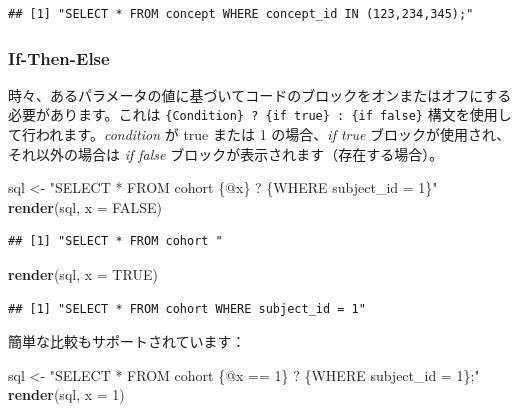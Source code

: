 \documentclass[
  11pt]{book}
\newenvironment{Shaded}{\begin{snugshade}}{\end{snugshade}}
\newcommand{\AttributeTok}[1]{\textcolor[rgb]{0.13,0.29,0.53}{#1}}
\newcommand{\ConstantTok}[1]{\textcolor[rgb]{0.56,0.35,0.01}{#1}}
\newcommand{\DecValTok}[1]{\textcolor[rgb]{0.00,0.00,0.81}{#1}}
\newcommand{\FunctionTok}[1]{\textcolor[rgb]{0.13,0.29,0.53}{\textbf{#1}}}
\newcommand{\NormalTok}[1]{#1}
\newcommand{\OtherTok}[1]{\textcolor[rgb]{0.56,0.35,0.01}{#1}}
\newcommand{\StringTok}[1]{\textcolor[rgb]{0.31,0.60,0.02}{#1}}
\theoremstyle{definition}
\theoremstyle{definition}
\theoremstyle{definition}
\theoremstyle{definition}
\theoremstyle{remark}
\begin{document}
\begin{verbatim}
## [1] "SELECT * FROM concept WHERE concept_id IN (123,234,345);"
\end{verbatim}

\subsubsection*{If-Then-Else}\label{if-then-else}

時々、あるパラメータの値に基づいてコードのブロックをオンまたはオフにする必要があります。これは \texttt{\{Condition\}\ ?\ \{if\ true\}\ :\ \{if\ false\}} 構文を使用して行われます。\emph{condition} が true または 1 の場合、\emph{if true} ブロックが使用され、それ以外の場合は \emph{if false} ブロックが表示されます（存在する場合）。

\begin{Shaded}
\begin{Highlighting}[]
\NormalTok{sql }\OtherTok{\textless{}{-}} \StringTok{"SELECT * FROM cohort \{@x\} ? \{WHERE subject\_id = 1\}"}
\FunctionTok{render}\NormalTok{(sql, }\AttributeTok{x =} \ConstantTok{FALSE}\NormalTok{)}
\end{Highlighting}
\end{Shaded}

\begin{verbatim}
## [1] "SELECT * FROM cohort "
\end{verbatim}

\begin{Shaded}
\begin{Highlighting}[]
\FunctionTok{render}\NormalTok{(sql, }\AttributeTok{x =} \ConstantTok{TRUE}\NormalTok{)}
\end{Highlighting}
\end{Shaded}

\begin{verbatim}
## [1] "SELECT * FROM cohort WHERE subject_id = 1"
\end{verbatim}

簡単な比較もサポートされています：

\begin{Shaded}
\begin{Highlighting}[]
\NormalTok{sql }\OtherTok{\textless{}{-}} \StringTok{"SELECT * FROM cohort \{@x == 1\} ? \{WHERE subject\_id = 1\};"}
\FunctionTok{render}\NormalTok{(sql, }\AttributeTok{x =} \DecValTok{1}\NormalTok{)}
\end{Highlighting}
\end{Shaded}
\end{document}
